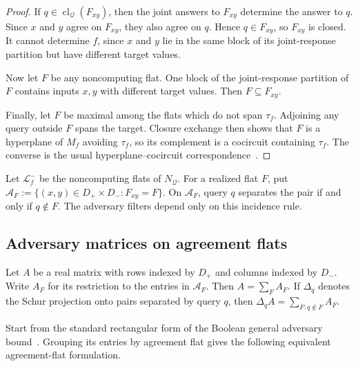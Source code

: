 \documentclass[11pt]{article}
\numberwithin{equation}{section}
\theoremstyle{remark}
\newcommand{\cl}{\operatorname{cl}}
\begin{document}
\begin{proof}
If $q\in\cl_{\mathcal Q}(F_{xy})$, then the joint answers to $F_{xy}$
determine the answer to $q$.  Since $x$ and $y$ agree on $F_{xy}$, they also
agree on $q$.  Hence $q\in F_{xy}$, so $F_{xy}$ is closed.  It cannot
determine $f$, since $x$ and $y$ lie in the same block of its joint-response
partition but have different target values.

Now let $F$ be any noncomputing flat.  One block of the joint-response
partition of $F$ contains inputs $x,y$ with different target values.  Then
$F\subseteq F_{xy}$.

Finally, let $F$ be maximal among the flats which do not span $\tau_f$.
Adjoining any query outside $F$ spans the target.  Closure exchange then
shows that $F$ is a hyperplane of $M_f$ avoiding $\tau_f$, so its complement
is a cocircuit containing $\tau_f$.  The converse is the usual
hyperplane--cocircuit correspondence~\cite[Chapter~2]{Oxley2011}.
\end{proof}

Let $\mathcal L_f^-$ be the noncomputing flats of $N_{\mathcal Q}$. For a realized flat $F$, put $\mathcal A_F:=\{(x,y)\in D_+\times D_-:F_{xy}=F\}$. On $\mathcal A_F$, query $q$ separates the pair if and only if $q\notin F$.
The adversary filters depend only on this incidence rule.

\subsection{Adversary matrices on agreement flats}
\label{subsec:flat-adversary-fibers}
\label{subsec:source-routing-norm}

Let $A$ be a real matrix with rows indexed by $D_+$ and columns indexed by
$D_-$.  Write $A_F$ for its restriction to the entries in $\mathcal A_F$.
Then $A=\sum_F A_F$. If $\Delta_q$ denotes the Schur projection onto pairs separated by query $q$, then $\Delta_qA=\sum_{F:q\notin F}A_F$.

Start from the standard rectangular form of the Boolean general adversary
bound~\cite{HoyerLeeSpalek2007}. Grouping its entries by agreement flat
gives the following equivalent agreement-flat formulation.
\end{document}
